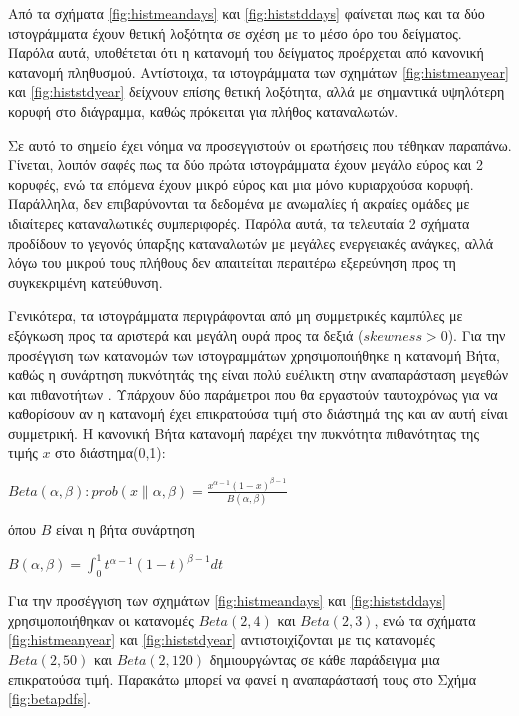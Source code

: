 Από τα σχήματα \ref{fig:histmeandays} και \ref{fig:histstddays} φαίνεται πως και τα δύο ιστογράμματα έχουν θετική λοξότητα σε σχέση με το μέσο όρο του δείγματος. Παρόλα αυτά, υποθέτεται ότι η κατανομή του δείγματος προέρχεται από κανονική κατανομή πληθυσμού. Αντίστοιχα, τα ιστογράμματα των σχημάτων \ref{fig:histmeanyear} και \ref{fig:histstdyear} δείχνουν επίσης θετική λοξότητα, αλλά με σημαντικά υψηλότερη κορυφή στο διάγραμμα, καθώς πρόκειται για πλήθος καταναλωτών.\par
Σε αυτό το σημείο έχει νόημα να προσεγγιστούν οι ερωτήσεις που τέθηκαν παραπάνω. Γίνεται, λοιπόν σαφές πως τα δύο πρώτα ιστογράμματα έχουν μεγάλο εύρος και 2 κορυφές, ενώ τα επόμενα έχουν μικρό εύρος και μια μόνο κυριαρχούσα κορυφή. Παράλληλα, δεν επιβαρύνονται τα δεδομένα με ανωμαλίες ή ακραίες ομάδες με ιδιαίτερες καταναλωτικές συμπεριφορές. Παρόλα αυτά, τα τελευταία 2 σχήματα προδίδουν το γεγονός ύπαρξης καταναλωτών με μεγάλες ενεργειακές ανάγκες, αλλά λόγω του μικρού τους πλήθους δεν απαιτείται περαιτέρω εξερεύνηση προς τη συγκεκριμένη κατεύθυνση.\par
Γενικότερα, τα ιστογράμματα περιγράφονται από μη συμμετρικές καμπύλες με εξόγκωση προς τα αριστερά και μεγάλη ουρά προς τα δεξιά ($skewness>0$). Για την προσέγγιση των κατανομών των ιστογραμμάτων χρησιμοποιήθηκε η κατανομή Βήτα, καθώς η συνάρτηση πυκνότητάς της είναι πολύ ευέλικτη στην αναπαράσταση μεγεθών και πιθανοτήτων \cite{betadstr}. Υπάρχουν δύο παράμετροι που θα εργαστούν ταυτοχρόνως για να καθορίσουν αν η κατανομή έχει επικρατούσα τιμή στο διάστημά της και αν αυτή είναι συμμετρική. Η κανονική Βήτα κατανομή παρέχει την πυκνότητα πιθανότητας της τιμής $x$ στο διάστημα(0,1):
\begin{center}
$Beta(\alpha, \beta):prob(x\|\alpha, \beta)=\frac{x^{\alpha-1}(1-x)^{\beta-1}}{B(\alpha, \beta)}$
\end{center}
όπου $B$ είναι η βήτα συνάρτηση
\begin{center}
$Β(\alpha, \beta)=\int_{0}^{1} t^{\alpha-1}(1-t)^{\beta-1}dt$
\end{center}
Για την προσέγγιση των σχημάτων \ref{fig:histmeandays} και \ref{fig:histstddays} χρησιμοποιήθηκαν οι κατανομές $Beta(2,4)$ και $Beta(2,3)$, ενώ τα σχήματα \ref{fig:histmeanyear} και \ref{fig:histstdyear} αντιστοιχίζονται με τις κατανομές $Beta(2,50)$ και $Beta(2,120)$ δημιουργώντας σε κάθε παράδειγμα μια επικρατούσα τιμή. Παρακάτω μπορεί να φανεί η αναπαράστασή τους στο Σχήμα \ref{fig:betapdfs}.

